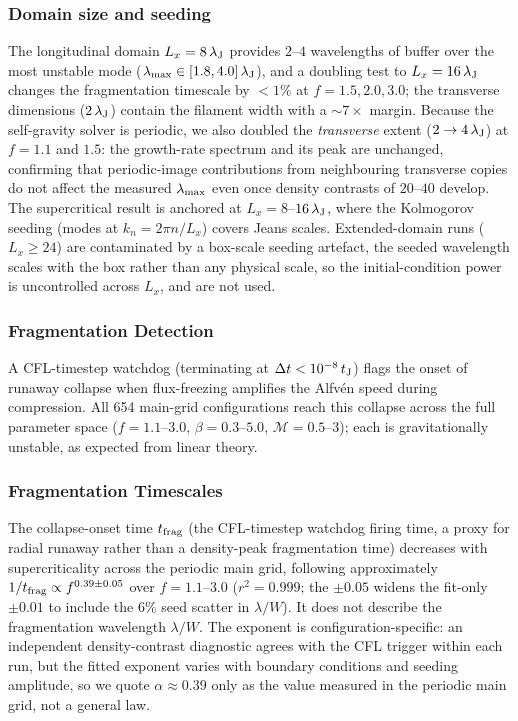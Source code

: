 \documentclass[usenatbib,twoside,twocolumn]{mnras}
\begin{document}
\subsubsection{Domain size and seeding}

The longitudinal domain $L_x=8\,\lambda_{\rm J}$ provides $2$--$4$ wavelengths of buffer over the most unstable mode ($\lambda_{\rm max}\in[1.8,4.0]\,\lambda_{\rm J}$), and a doubling test to $L_x=16\,\lambda_{\rm J}$ changes the fragmentation timescale by $<1\%$ at $f=1.5,2.0,3.0$; the transverse dimensions ($2\,\lambda_{\rm J}$) contain the filament width with a $\sim7\times$ margin. Because the self-gravity solver is periodic, we also doubled the \emph{transverse} extent ($2\to4\,\lambda_{\rm J}$) at $f=1.1$ and $1.5$: the growth-rate spectrum and its peak are unchanged, confirming that periodic-image contributions from neighbouring transverse copies do not affect the measured $\lambda_{\rm max}$ even once density contrasts of $20$--$40$ develop. The supercritical result is anchored at $L_x=8$--$16\,\lambda_{\rm J}$, where the Kolmogorov seeding (modes at $k_n=2\pi n/L_x$) covers Jeans scales. Extended-domain runs ($L_x\geq24$) are contaminated by a box-scale seeding artefact, the seeded wavelength scales with the box rather than any physical scale, so the initial-condition power is uncontrolled across $L_x$, and are not used.

\subsubsection{Fragmentation Detection}

A CFL-timestep watchdog (terminating at $\Delta t<10^{-8}\,t_{\rm J}$) flags the onset of runaway collapse when flux-freezing amplifies the Alfv\'en speed during compression. All 654 main-grid configurations reach this collapse across the full parameter space ($f=1.1$--$3.0$, $\beta=0.3$--$5.0$, $\mathcal{M}=0.5$--$3$); each is gravitationally unstable, as expected from linear theory.

\subsubsection{Fragmentation Timescales}

The collapse-onset time $t_{\rm frag}$ (the CFL-timestep watchdog firing time, a proxy for radial runaway rather than a density-peak fragmentation time) decreases with supercriticality across the periodic main grid, following approximately $1/t_{\rm frag}\propto f^{0.39\pm0.05}$ over $f=1.1$--$3.0$ ($r^2=0.999$; the $\pm0.05$ widens the fit-only $\pm0.01$ to include the 6\% seed scatter in $\lambda/W$). It does not describe the fragmentation wavelength $\lambda/W$. The exponent is configuration-specific: an independent density-contrast diagnostic agrees with the CFL trigger within each run, but the fitted exponent varies with boundary conditions and seeding amplitude, so we quote $\alpha\approx0.39$ only as the value measured in the periodic main grid, not a general law.
\end{document}
